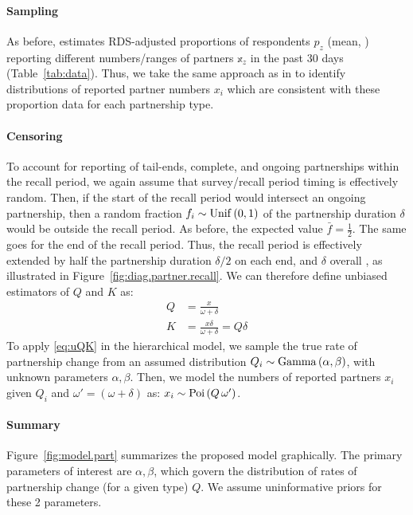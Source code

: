 \paragraph{Sampling}
As before, \cite{Baral2014} estimates RDS-adjusted proportions of respondents $p_z$ (mean, \ci)
reporting different numbers/ranges of partners $\mathbb{x}_z$ in the past 30 days
(Table~\ref{tab:data}).
Thus, we take the same approach as in 
to identify distributions of reported partner numbers $x_i$
which are consistent with these proportion data for each partnership type.
\paragraph{Censoring}
To account for reporting of tail-ends, complete, and ongoing partnerships within the recall period,
we again assume that survey/recall period timing is effectively random.
Then, if the start of the recall period would intersect an ongoing partnership,
then a random fraction $f_i \sim \mathrm{Unif}\,(0,1)$ of the partnership duration $\delta$
would be outside the recall period.
As before, the expected value $\bar{f} = \frac12$.
The same goes for the end of the recall period.
Thus, the recall period is effectively extended by
half the partnership duration $\delta/2$ on each end, and $\delta$ overall \cite{Neely2023},
as illustrated in Figure~\ref{fig:diag.partner.recall}.
We can therefore define unbiased estimators of $Q$ and $K$ as:
\begin{subequations}\label{eq:uQK}
\begin{alignat}{1}
  Q &= \frac{x}{\omega + \delta}\\
  K &= \frac{x \delta}{\omega + \delta} = Q \delta
\end{alignat}
\end{subequations}
To apply \eqref{eq:uQK} in the hierarchical model, we sample the true rate of partnership change
from an assumed distribution $Q_i \sim \mathrm{Gamma}\,(\alpha,\beta)$,
with unknown parameters $\alpha, \beta$.
Then, we model the numbers of reported partners $x_i$
given $Q_i$ and $\omega' = (\omega + \delta)$ as: $x_i \sim \mathrm{Poi}\,(Q\,\omega')$.
\paragraph{Summary}
Figure~\ref{fig:model.part} summarizes the proposed model graphically.
The primary parameters of interest are $\alpha, \beta$, which govern
the distribution of rates of partnership change (for a given type) $Q$.
We assume uninformative priors for these 2 parameters.
